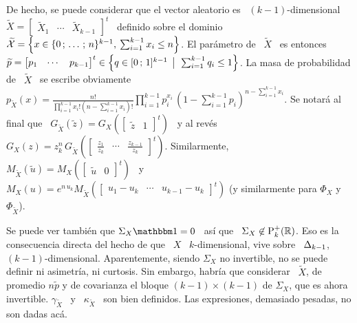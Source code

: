 De hecho, se puede considerar que el vector aleatorio es \ $(k-1)$-dimensional \
$\widetilde{X}     =    \begin{bmatrix}     \widetilde{X}_1    &     \cdots    &
  \widetilde{X}_{k-1}   \end{bmatrix}^t$   \  definido   sobre   el  dominio   \
$\widetilde{\mathcal{X}} = \left\{ x \in \{ 0 \, ; \, \ldots \, ; \, n\}^{k-1}, \: \sum_{i=1}^{k-1}
  x_i  \le n  \right\}$. El  par\'ametro de  \ $\widetilde{X}$  \ es  entonces \
$\widetilde{p}     =     \protect\begin{bmatrix}      p_1     &     \cdots     &
  p_{k-1}  \end{bmatrix}^t\protect  \in  \left\{   q  \in  [0  \, ; \,  1]^{k-1}  \:\: \big| \:\:
  \sum_{i=1}^{k-1}  q_i  \le  1  \right\}$.    La  masa  de  probabilidad  de  \
$\widetilde{X}$   \   se    escribe   obviamente   \   $p_{\widetilde{X}}(x)   =
\frac{n!}{\prod_{i=1}^{k-1} x_i!   (n-\sum_{i=1}^{k-1} x_i)!}  \prod_{i=1}^{k-1}
p_i^{x_i} \, \left( 1  - \sum_{i=1}^{k-1} p_i \right)^{n-\sum_{i=1}^{k-1} x_i}$.
Se  notar\'a al  final que  \ $G_{\widetilde{X}}\left(  \widetilde{z}  \right) =
G_X\left(  \begin{bmatrix} \widetilde{z}  & 1  \end{bmatrix}^t \right)$  \  y al
rev\'es   \   $G_X(z)  =   z_k^n   \,  G_{\widetilde{X}}\left(   \begin{bmatrix}
    \frac{z_1}{z_k}  & \cdots  &  \frac{z_{k-1}}{z_k} \end{bmatrix}^t  \right)$.
Similarmente,    \     $M_{\widetilde{X}}\left(    \widetilde{u}    \right)    =
M_X\left(  \begin{bmatrix} \widetilde{u}  &  0 \end{bmatrix}^t  \right)$  \ y  \
$M_X(u)  = e^{n  \, u_k}  M_{\widetilde{X}}\left(  \begin{bmatrix} u_1  - u_k  &
    \cdots  &  u_{k-1}  -  u_k  \end{bmatrix}^t \right)$  (y  similarmente  para
$\Phi_X$ y $\Phi_{\widetilde{X}}$).

Se puede ver  tambi\'en que $\Sigma_X \un  = 0$ \ as\'i que  \ $\Sigma_X \not\in
\mathrm{P}_k^+(\mathbb{R})$.   Eso  es la  consecuencia  directa  del hecho  de  que  \ $X$  \
$k$-dimensional, vive sobre  \ $\Delta_{k-1}$, $(k-1)$-dimensional. Aparentemente,
siendo  $\Sigma_X$  no  invertible,  no  se  puede  definir  ni  asimetr\'ia,  ni
curtosis. Sin embargo, habr\'ia que considerar \ $\widetilde{X}$, de promedio $n
\widetilde{p}$ y de covarianza el bloque $(k-1) \times (k-1)$ de $\Sigma_X$, que es
ahora invertible. $\gamma_{\widetilde{X}}$ \  y \ $\kappa_{\widetilde{X}}$ \ son
bien definidos. Las expresiones, demasiado pesadas, no son dadas ac\'a.

